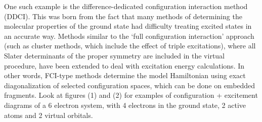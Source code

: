 \documentclass[10pt]{article}
\begin{document}
One such example is the difference-dedicated configuration interaction method (DDCI). This was born from the fact that many methods of determining the molecular properties of the ground state had difficulty treating excited states in an accurate way. Methods similar to the `full configuration interaction' approach (such as cluster methods, which include the effect of triple excitations), where all Slater determinants of the proper symmetry are included in the virtual procedure, have been extended to deal with excitation energy calculations. In other words, FCI-type methods determine the model Hamiltonian using exact diagonalization of selected configuration spaces, which can be done on embedded fragments. Look at figures (1) and (2) for examples of configuration + excitement diagrams of a 6 electron system, with 4 electrons in the ground state, 2 active atoms and 2 virtual orbitals.
\end{document}
